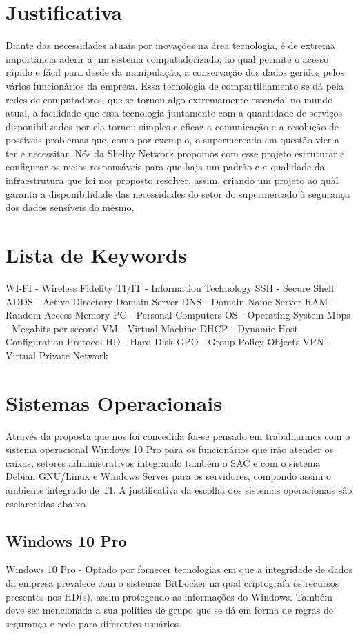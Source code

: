 \documentclass[12pt]{article}
\begin{document}
\section{Justificativa}
Diante das necessidades atuais por inovações na área tecnologia, é de extrema importância aderir a um sistema computadorizado, ao qual permite o acesso rápido e fácil para desde da manipulação, a conservação dos dados geridos pelos vários funcionários da empresa. Essa tecnologia de compartilhamento se dá pela redes de computadores, que se tornou algo extremamente essencial no mundo atual, a facilidade que essa tecnologia juntamente com a quantidade de serviços disponibilizados por ela tornou simples e eficaz a comunicação e a resolução de possíveis problemas que, como por exemplo, o supermercado em questão vier a ter e necessitar. Nós da Shelby Network propomos com esse projeto estruturar e configurar os meios responsáveis para que haja um padrão e a qualidade da infraestrutura que foi nos proposto resolver, assim, criando um projeto ao qual garanta a disponibilidade das necessidades do setor do supermercado à segurança dos dados sensíveis do mesmo.

\section{Lista de Keywords}
WI-FI - Wireless Fidelity
TI/IT - Information Technology
SSH - Secure Shell
ADDS - Active Directory Domain Server
DNS - Domain Name Server
RAM - Random Access Memory
PC - Personal Computers
OS - Operating System
Mbps - Megabits per second
VM - Virtual Machine
DHCP - Dynamic Host Configuration Protocol
HD - Hard Disk
GPO - Group Policy Objects
VPN - Virtual Private Network

\section{Sistemas Operacionais}
Através da proposta que nos foi concedida foi-se pensado em trabalharmos com o sistema operacional Windows 10 Pro para os funcionários que irão atender os caixas, setores administrativos integrando também o SAC e com o sistema Debian  GNU/Linux e Windows Server para os servidores, compondo assim o ambiente integrado de TI. A justificativa da escolha dos sistemas operacionais são esclarecidas abaixo.

\subsection{Windows 10 Pro}
Windows 10 Pro - Optado por fornecer tecnologias em que a integridade de dados da empresa prevalece com o sistemas BitLocker na qual criptografa os recursos presentes nos HD(s), assim protegendo as informações do Windows. Também deve ser mencionada a sua política de grupo que se dá em forma de regras de segurança e rede para diferentes usuários.
\end{document}
